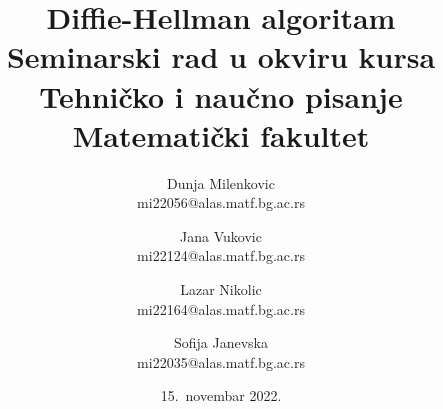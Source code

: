 \documentclass[a4paper]{article}
\begin{document}
\title{Diffie-Hellman algoritam\\ \small{Seminarski rad u okviru kursa\\Tehničko i naučno pisanje\\ Matematički fakultet}}

\author{Dunja Milenkovic\\ mi22056@alas.matf.bg.ac.rs\and Jana Vukovic\\mi22124@alas.matf.bg.ac.rs\and Lazar Nikolic\\mi22164@alas.matf.bg.ac.rs\and Sofija Janevska\\mi22035@alas.matf.bg.ac.rs }
\date{15.~novembar 2022.}
\maketitle
\end{document}

